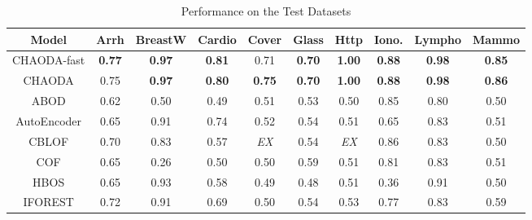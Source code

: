 \begin{table*}[!t]
\renewcommand{\arraystretch}{1.15}
\caption{Performance on the Test Datasets}
\label{table:results:test-performance}
\vskip 0.15in
\begin{center}
\begin{small}
\begin{sc}
\begin{tabular}{|c|c|c|c|c|c|c|c|c|c|}
\hline
\textbf{Model} & \textbf{Arrh} & \textbf{BreastW} & \textbf{Cardio} & \textbf{Cover} & \textbf{Glass} & \textbf{Http} & \textbf{Iono.} & \textbf{Lympho} & \textbf{Mammo} \\
\hline
        CHAODA-fast &       \textbf{0.77} &    \textbf{0.97} &   \textbf{0.81} &           0.71 &  \textbf{0.70} & \textbf{1.00} &                \textbf{0.88} &   \textbf{0.98} &  \textbf{0.85} \\
\hline
        CHAODA &       0.75 &    \textbf{0.97} &   \textbf{0.80} &  \textbf{0.75} &  \textbf{0.70} & \textbf{1.00} &                \textbf{0.88} &   \textbf{0.98} &  \textbf{0.86} \\
\hline
        ABOD &                0.62 &             0.50 &            0.49 &           0.51 &           0.53 &          0.50 &                0.85 &            0.80 &           0.50 \\
\hline
AutoEncoder &                0.65 &             0.91 &            0.74 &           0.52 &           0.54 &          0.51 &                0.65 &            0.83 &           0.51 \\
\hline
        CBLOF &                0.70 &             0.83 &            0.57 &    \textit{EX} &           0.54 &   \textit{EX} &                0.86 &            0.83 &           0.50 \\
\hline
        COF &                0.65 &             0.26 &            0.50 &           0.50 &           0.59 &          0.51 &                0.81 &            0.83 &           0.51 \\
\hline
        HBOS &                0.65 &             0.93 &            0.58 &           0.49 &           0.48 &          0.51 &                0.36 &            0.91 &           0.50 \\
\hline
IFOREST &                0.72 &             0.91 &            0.69 &           0.50 &           0.54 &          0.53 &                0.77 &            0.83 &           0.59 \\
\hline

\end{tabular}
\end{sc}
\end{small}
\end{center}
\end{table*}
